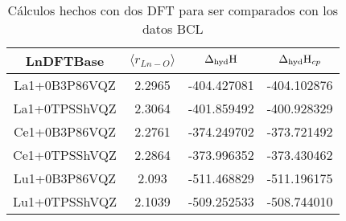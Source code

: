  \begin{center}                                                                            
 \begin{table}[h!]\label{t2}                                                               
 \centering
 \caption{\footnotesize C\'alculos hechos con dos DFT para ser comparados con los datos
  BCL}                                                                  
 \begin{tabular}{c|ccc}\hline\hline                                                          
 LnDFTBase    & $\langle r_{Ln-O}\rangle$ & $\Delta_{\textnormal{hyd}}\textnormal{H}$ 
 & $\Delta_{\textnormal{hyd}}\textnormal{H}_{cp}$ \\ \hline                                               
La1+0B3P86VQZ & 2.2965 & -404.427081 & -404.102876 \\
La1+0TPSShVQZ & 2.3064 & -401.859492 & -400.928329 \\
Ce1+0B3P86VQZ & 2.2761 & -374.249702 & -373.721492 \\
Ce1+0TPSShVQZ & 2.2864 & -373.996352 & -373.430462 \\
Lu1+0B3P86VQZ & 2.093  & -511.468829 & -511.196175 \\
Lu1+0TPSShVQZ & 2.1039 & -509.252533 & -508.744010 \\
 \hline \end{tabular}\end{table}                                                           
 \end{center}                                                                              
